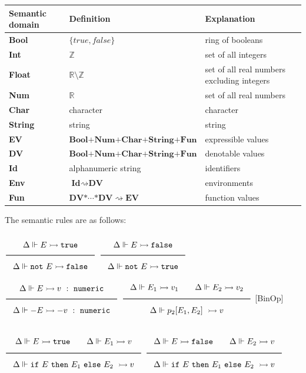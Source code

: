 \documentclass[a4paper]{article}
\newcommand{\Rule}[2]{\genfrac{}{}{0.7pt}{}{{\setlength{\fboxrule}{0pt}\setlength{\fboxsep}{3mm}\fbox{$#1$}}}{{\setlength{\fboxrule}{0pt}\setlength{\fboxsep}{3mm}\fbox{$#2$}}}}
\newcommand{\TruE}{\texttt{true}}
\newcommand{\FalsE}{\texttt{false}}
\newcommand{\Num}{\texttt{numeric}}
\newcommand{\eval}{\rightarrowtail}
\newcommand{\partfun}{\rightsquigarrow}
\newcommand{\under}{\Vdash}
\begin{document}
\vspace{3mm}
\begin{center}
\begin{tabular}{|l|ll|} \hline
Semantic domain & Definition & Explanation\\ \hline
\textbf{Bool} & $\{\textit{true}, \textit{false}\}$ & ring of booleans  \\
\textbf{Int}  & $\mathbb{Z}$     & set of all integers \\
\textbf{Float}  & $\mathbb{R} \setminus \mathbb{Z}$     & set of all real numbers excluding integers \\
\textbf{Num}  & $\mathbb{R}$     & set of all real numbers \\
\textbf{Char}  & character     & character \\
\textbf{String}  & string     & string \\
\textbf{EV}   & $\textbf{Bool} \boldsymbol{+} \textbf{Num} \boldsymbol{+} \textbf{Char} \boldsymbol{+} \textbf{String} \boldsymbol{+} \textbf{Fun} $     & expressible values \\
\textbf{DV}   & $\textbf{Bool} \boldsymbol{+} \textbf{Num} \boldsymbol{+} \textbf{Char} \boldsymbol{+} \textbf{String} \boldsymbol{+} \textbf{Fun} $     & denotable values \\
\textbf{Id}   & alphanumeric string     & identifiers \\
\textbf{Env}   & $\textbf{Id} \partfun \textbf{DV}$ & environments \\
\textbf{Fun}   & $\textbf{DV} \boldsymbol{*} \cdots \boldsymbol{*} \textbf{DV} \partfun \textbf{EV}$ & function values \\ \hline
\end{tabular}
\end{center}

The semantic rules are as follows:

$\Rule{\Delta \under E \eval \TruE}{\Delta \under \texttt{not}\ E \eval \FalsE}$
\hfill
$\Rule{\Delta \under E \eval \FalsE}{\Delta \under \texttt{not}\ E \eval \TruE}$
\hfill
$\Rule{\Delta \under E \eval v\ :\ \Num}{\Delta \under -E \eval -v\ :\ \Num}$
\hfill
$\Rule{\Delta \under E_1 \eval v_1 \qquad \Delta \under E_2 \eval v_2}{\Delta \under p_2[E_1, E_2]\ \eval v}$ [BinOp]

$\Rule{\Delta \under E \eval \TruE \qquad \Delta \under E_1 \eval v}{\Delta \under \texttt{if}\ E\ \texttt{then}\ E_1\ \texttt{else}\ E_2\ \eval v}$
\hfill
$\Rule{\Delta \under E \eval \FalsE \qquad \Delta \under E_2 \eval v}{\Delta \under \texttt{if}\ E\ \texttt{then}\ E_1\ \texttt{else}\ E_2\ \eval v}$
\end{document}
